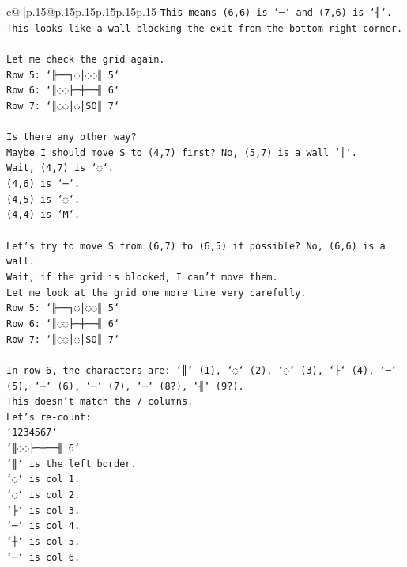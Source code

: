 \documentclass{article}
\begin{document}
{\begin{supertabular}{c@{$\;$}|p{.15\linewidth}@{}p{.15\linewidth}p{.15\linewidth}p{.15\linewidth}p{.15\linewidth}p{.15\linewidth}}
{{{\texttt{This means (6,6) is `─` and (7,6) is `╢`.} \\
\texttt{This looks like a wall blocking the exit from the bottom{-}right corner.} \\
\\ 
\texttt{Let me check the grid again.} \\
\texttt{Row 5: `╟──┐◌│◌◌║ 5`} \\
\texttt{Row 6: `║◌◌├─┼──╢ 6`} \\
\texttt{Row 7: `║◌◌│◌│SO║ 7`} \\
\\ 
\texttt{Is there any other way?} \\
\texttt{Maybe I should move S to (4,7) first? No, (5,7) is a wall `│`.} \\
\texttt{Wait, (4,7) is `◌`.} \\
\texttt{(4,6) is `─`.} \\
\texttt{(4,5) is `◌`.} \\
\texttt{(4,4) is `M`.} \\
\\ 
\texttt{Let's try to move S from (6,7) to (6,5) if possible? No, (6,6) is a wall.} \\
\texttt{Wait, if the grid is blocked, I can't move them.} \\
\texttt{Let me look at the grid one more time very carefully.} \\
\texttt{Row 5: `╟──┐◌│◌◌║ 5`} \\
\texttt{Row 6: `║◌◌├─┼──╢ 6`} \\
\texttt{Row 7: `║◌◌│◌│SO║ 7`} \\
\\ 
\texttt{In row 6, the characters are: `║` (1), `◌` (2), `◌` (3), `├` (4), `─` (5), `┼` (6), `─` (7), `─` (8?), `╢` (9?).} \\
\texttt{This doesn't match the 7 columns.} \\
\texttt{Let's re{-}count:} \\
\texttt{`1234567`} \\
\texttt{`║◌◌├─┼──╢ 6`} \\
\texttt{`║` is the left border.} \\
\texttt{`◌` is col 1.} \\
\texttt{`◌` is col 2.} \\
\texttt{`├` is col 3.} \\
\texttt{`─` is col 4.} \\
\texttt{`┼` is col 5.} \\
\texttt{`─` is col 6.} \\
}}}
\end{supertabular}}
\end{document}
